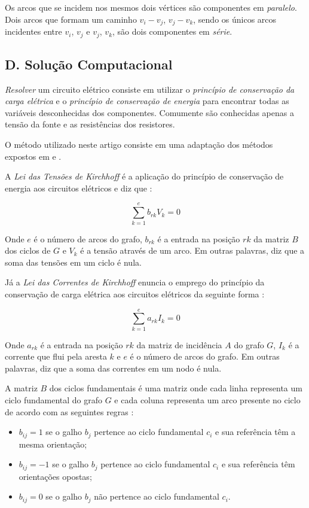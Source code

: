 \documentclass[twocolumn, 10pt]{extarticle}
\begin{document}
Os arcos que se incidem nos mesmos dois vértices são componentes em \textit{paralelo}. Dois arcos que formam um caminho $v_i - v_j$, $v_j - v_k$, sendo os únicos arcos incidentes entre $v_i$, $v_j$ e $v_j$, $v_k$, são dois componentes em \textit{série}.

\subsection*{D. \quad Solução Computacional}

\textit{Resolver} um circuito elétrico consiste em utilizar o \textit{princípio de conservação da carga elétrica} e o \textit{princípio de conservação de energia} para encontrar todas as variáveis desconhecidas dos componentes. Comumente são conhecidas apenas a tensão da fonte e as resistências dos resistores.

O método utilizado neste artigo consiste em uma adaptação dos métodos expostos em \cite{krishna} e \cite{boruah}.

A \textit{Lei das Tensões de Kirchhoff} é a aplicação do princípio de conservação de energia aos circuitos elétricos e diz que \cite[p. 945]{boruah}:

\[
\sum_{k=1}^{e} b_{rk}V_k = 0
\]

Onde $e$ é o número de arcos do grafo, $b_{rk}$ é a entrada na posição $rk$ da matriz $B$ dos ciclos de $G$ e $V_k$ é a tensão através de um arco. Em outras palavras, diz que a soma das tensões em um ciclo é nula.

Já a \textit{Lei das Correntes de Kirchhoff} enuncia o emprego do princípio da conservação de carga elétrica aos circuitos elétricos da seguinte forma \cite[p. 945]{boruah}:

\[
\sum_{k=1}^{e} a_{rk}I_k = 0
\]

Onde $a_{rk}$ é a entrada na posição $rk$ da matriz de incidência $A$ do grafo $G$, $I_k$ é a corrente que flui pela aresta $k$ e $e$ é o número de arcos do grafo. Em outras palavras, diz que a soma das correntes em um nodo é nula.

A matriz $B$ dos ciclos fundamentais é uma matriz onde cada linha representa um ciclo fundamental do grafo $G$ e cada coluna representa um arco presente no ciclo de acordo com as seguintes regras \cite[p. 948]{boruah}:

\begin{itemize}
	\item $b_{ij} = 1$ se o galho $b_j$ pertence ao ciclo fundamental $c_i$ e sua referência têm a mesma orientação;
	\item $b_{ij} = -1$ se o galho $b_j$ pertence ao  ciclo fundamental $c_i$ e sua referência têm orientações opostas;
	\item $b_{ij} = 0$ se o galho $b_j$ não pertence ao ciclo fundamental $c_i$.
\end{itemize}
\end{document}
